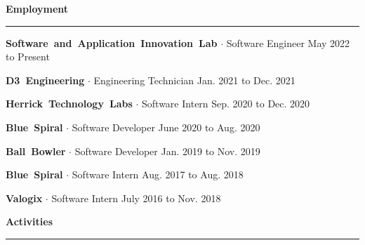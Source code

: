 \documentclass{article}
\newcommand{\rSection}[1] {
  \textcolor{header-blue} {
    \textbf{{\fontsize{0.5cm}{0.45cm}\selectfont \hbox{#1}}} \\
    \rule{0.30\textwidth}{0.1cm}
  }
}
\newcommand{\rSubSubSection}[1] {
  \textbf{{\fontsize{0.35cm}{0.45cm}\selectfont \hbox{#1}}}
}
\begin{document}
\rSection{Employment} \par

\rSubSubSection{Software and Application Innovation Lab} $ \cdot $ Software Engineer \hfill May 2022 to Present \par
\vspace{-10pt}
    
\vspace{-10pt}

\rSubSubSection{D3 Engineering} $ \cdot $ Engineering Technician \hfill Jan. 2021 to Dec. 2021 \par
\vspace{-10pt}
    
\vspace{-10pt}

\rSubSubSection{Herrick Technology Labs} $ \cdot $ Software Intern \hfill Sep. 2020 to Dec. 2020 \par
\vspace{-10pt}
    
\vspace{-10pt}

\rSubSubSection{Blue Spiral} $ \cdot $ Software Developer \hfill June 2020 to Aug. 2020 \par
\vspace{-10pt}
    
\vspace{-10pt}

\rSubSubSection{Ball Bowler} $ \cdot $ Software Developer \hfill Jan. 2019 to Nov. 2019 \par
\vspace{-10pt}
    
\vspace{-10pt}

\rSubSubSection{Blue Spiral} $ \cdot $ Software Intern \hfill Aug. 2017 to Aug. 2018 \par
\vspace{-10pt}
    
\vspace{-10pt}

\rSubSubSection{Valogix} $ \cdot $ Software Intern \hfill July 2016 to Nov. 2018 \par
\vspace{-10pt}
    
\vspace{-10pt}

\rSection{Activities} \par
\end{document}
